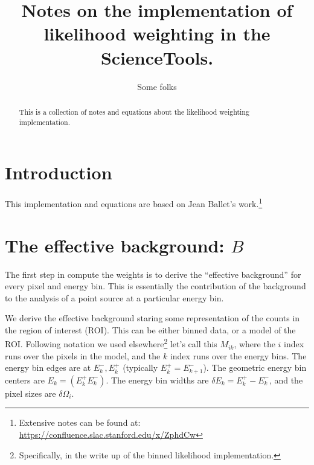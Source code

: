 \documentclass[preprint]{aastex}
\begin{document}
%
\title{Notes on the implementation of likelihood weighting in the ScienceTools.}  

\author{ 
Some folks
}



\begin{abstract}
  This is a collection of notes and equations about the likelihood weighting implementation.
\end{abstract}

\maketitle

\section{Introduction}

This implementation and equations are based on Jean Ballet's work.\footnote{Extensive notes can be found at: \url{https://confluence.slac.stanford.edu/x/ZphdCw}}


\section{The effective background: $B$}

The first step in compute the weights is to derive the ``effective
background'' for every pixel and energy bin.  This is essentially the
contribution of the background to the analysis of a point source at a
particular energy bin.

We derive the effective background staring some representation of the
counts in the region of interest (ROI).  This can be either binned
data, or a model of the ROI.  Following notation we used
elsewhere\footnote{Specifically, in the write up of the binned
  likelihood implementation.} let's call this $M_{ik}$, where the $i$
index runs over the pixels in the model, and the $k$ index runs over
the energy bins.  The energy bin edges are at $E_k^-, E_k^+$
(typically $E_k^+ = E_{k+1}^-$).  The geometric energy bin centers are
$E_k = (E_k^+ E_k^-)$.  The energy bin widths are $\delta E_k = E_k^+
- E_k^-$, and the pixel sizes are $\delta \Omega_i$.
\end{document}
